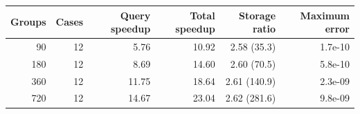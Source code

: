 \begin{tabular}{rrrrrr}
\toprule
Groups & Cases & Query speedup & Total speedup & Storage ratio & Maximum error \\
\midrule
90 & 12 & 5.76 & 10.92 & 2.58 (35.3) & 1.7e-10 \\
180 & 12 & 8.69 & 14.60 & 2.60 (70.5) & 5.8e-10 \\
360 & 12 & 11.75 & 18.64 & 2.61 (140.9) & 2.3e-09 \\
720 & 12 & 14.67 & 23.04 & 2.62 (281.6) & 9.8e-09 \\
\bottomrule
\end{tabular}
